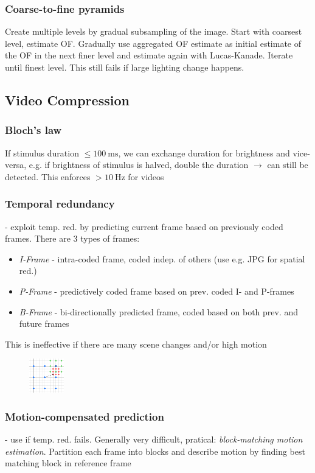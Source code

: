 \documentclass[a4paper,10pt]{article}
\begin{document}
\subsubsection{Coarse-to-fine pyramids} Create multiple levels by gradual subsampling of the image. Start with coarsest level, estimate OF. Gradually use aggregated OF estimate as initial estimate of the OF in the next finer level and estimate again with Lucas-Kanade. Iterate until finest level. This still fails if large lighting change happens.

\subsection{Video Compression}
\subsubsection{Bloch's law} If stimulus duration \( \le \qty{100}{\milli\second}\), we can exchange duration for brightness and vice-versa, e.g. if brightness of stimulus is halved, double the duration \( \rightarrow \) can still be detected. This enforces \( > \qty{10}{\hertz} \) for videos
\subsubsection{Temporal redundancy} - exploit temp. red. by predicting current frame based on previously coded frames. There are 3 types of frames:
    \begin{itemize}
	\item \textit{I-Frame} - intra-coded frame, coded indep. of others (use e.g. JPG for spatial red.)
	\item \textit{P-Frame} - predictively coded frame based on prev. coded I- and P-frames
	\item \textit{B-Frame} - bi-directionally predicted frame, coded based on both prev. and future frames
    \end{itemize}
    This is ineffective if there are many scene changes and/or high motion

\begin{figure} 
    \centering 
    \includegraphics[width=1.5cm]{three-step-search.png}
\end{figure}

\subsubsection{Motion-compensated prediction} - use if temp. red. fails. Generally very difficult, pratical: \textit{block-matching motion estimation}. Partition each frame into blocks and describe motion by finding best matching block in reference frame
\end{document}
